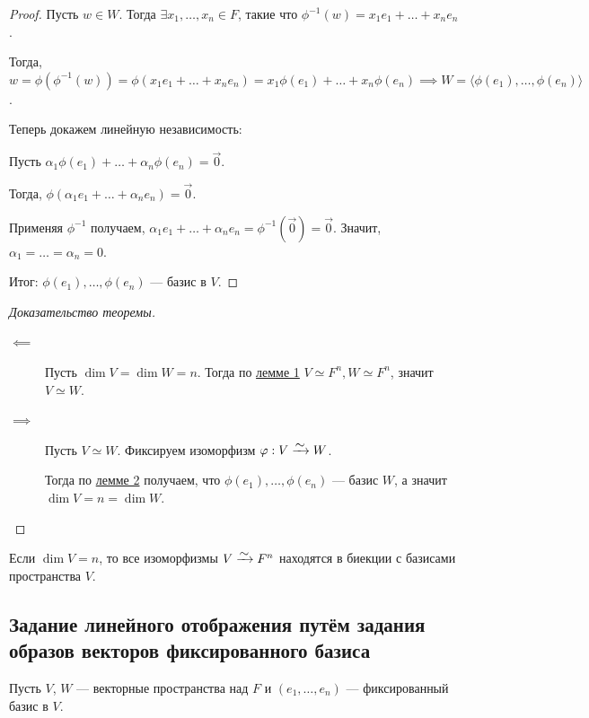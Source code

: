 \begin{proof}
    Пусть $w \in W$. Тогда $\exists x_1, \dots, x_n \in F$, такие что $\phi^{-1}(w) = x_1 e_1 + \dots + x_n e_n$.

    Тогда, $w = \phi\left(\phi^{-1}(w)\right) = \phi(x_1 e_1 + \dots + x_n e_n) = x_1 \phi(e_1) + \dots + x_n \phi(e_n) \implies W = \langle \phi(e_1), \dots, \phi(e_n) \rangle$.

    Теперь докажем линейную независимость:

    Пусть $\alpha_1 \phi(e_1) + \dots + \alpha_n \phi(e_n) = \overrightarrow{0}$.

    Тогда, $\phi(\alpha_1 e_1 + \dots + \alpha_n e_n) = \overrightarrow{0}$.

    Применяя $\phi^{-1}$ получаем, $\alpha_1 e_1 + \dots + \alpha_n e_n = \phi^{-1}(\overrightarrow{0}) = \overrightarrow{0}$. Значит, $\alpha_1 = \dots = \alpha_n = 0$.

    Итог: $\phi(e_1), \dots, \phi(e_n)$ --- базис в $V$.
\end{proof}

\begin{proof}[Доказательство теоремы]~
    \begin{description}
    \item[$\impliedby$] Пусть $\dim V= \dim W = n$. Тогда по \hyperref[lec16:lemma_1]{лемме 1} $V \simeq F^n, W \simeq F^n$, значит $V \simeq W$.
    \item[$\implies$] Пусть $V \simeq W$. Фиксируем изоморфизм $\phi : V \MapsTo W$.

        Тогда по \hyperref[lec16:lemma_2]{лемме 2} получаем, что $\phi(e_1), \dots, \phi(e_n)$ --- базис $W$, а значит $\dim V = n = \dim W$.
        \qedhere
    \end{description}
\end{proof}

\begin{exercise}
    Если $\dim V = n$, то все изоморфизмы $V \MapsTo F^n$ находятся в биекции с базисами пространства $V$.
\end{exercise}


\subsection{Задание линейного отображения путём задания образов векторов фиксированного базиса}

Пусть $V$, $W$ --- векторные пространства над $F$ и $(e_1, \dots, e_n)$ --- фиксированный базис в $V$.

